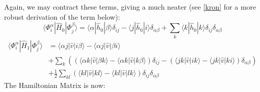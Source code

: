 \documentclass{article}
\begin{document}
Again, we may contract these terms, giving a much neater (see \ref{kron} for a more robust derivation of the term below):
\begin{equation}
    \langle \Phi_i^\alpha | \hat H_0 | \Phi_j^\beta \rangle = \langle \alpha | \hat h_0 | \beta \rangle \delta_{ij} - \langle j | \hat h_0 | i \rangle \delta_{\alpha \beta} + \sum_k \langle k | \hat h_0 | k \rangle \delta_{ij} \delta_{\alpha \beta}
\end{equation}
\begin{equation}
    \begin{split}
    \langle \Phi_i^\alpha | \hat H_1 | \Phi_j^\beta \rangle &= \langle \alpha j | \hat v | i \beta \rangle - \langle \alpha j | \hat v | \beta i \rangle \\
    &+ \sum_k \left(\left( \langle \alpha k | \hat v | \beta k \rangle - \langle \alpha k | \hat v | k \beta \rangle \right) \delta_{ij} - \left(\langle j k | \hat v | ik \rangle - \langle j k| \hat v |  ki \rangle \right)\delta_{\alpha \beta}\right) \\ 
    &+ \frac{1}{2} \sum_{kl}\left( \langle k l | \hat v | kl \rangle - \langle k l | \hat v | lk \rangle \right)\delta_{ij}\delta_{\alpha\beta}
    \end{split}
\end{equation}
The Hamiltonian Matrix is now:
\end{document}
